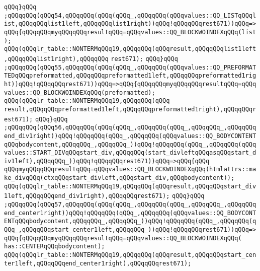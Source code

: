 \verb|qQQq}qQQq|\newline
\verb|;qQQqqQQq(qQQq54,qQQqqQQq(qQQq(qQQq_,qQQqqQQq(qQQqvalues::QQ_LISTqQQqlist,qQQqqQQqlist1left,qQQqqQQqlist1right))qQQq!qQQqqQQqrest671))qQQq=>qQQq{qQQqqQQqmyqQQqqQQqresultqQQq=qQQqvalues::QQ_BLOCKWOINDEXqQQq(list);|\newline
\verb|qQQq(qQQqlr_table::NONTERMqQQq19,qQQqqQQq(qQQqresult,qQQqqQQqlist1left,qQQqqQQqlist1right),qQQqqQQq|\newline
\verb|rest671);|\newline
\verb|qQQq}qQQq|\newline
\verb|;qQQqqQQq(qQQq55,qQQqqQQq(qQQq(qQQq_,qQQqqQQq(qQQqvalues::QQ_PREFORMATTEDqQQqpreformatted,qQQqqQQqpreformatted1left,qQQqqQQqpreformatted1right))qQQq!qQQqqQQqrest671))qQQq=>qQQq{qQQqqQQqmyqQQqqQQqresultqQQq=qQQqvalues::QQ_BLOCKWOINDEXqQQq(preformatted);|\newline
\verb|qQQq(qQQqlr_table::NONTERMqQQq19,qQQqqQQq(qQQq|\newline
\verb|result,qQQqqQQqpreformatted1left,qQQqqQQqpreformatted1right),qQQqqQQqrest671);|\newline
\verb|qQQq}qQQq|\newline
\verb|;qQQqqQQq(qQQq56,qQQqqQQq(qQQq(qQQq_,qQQqqQQq(qQQq_,qQQqqQQq_,qQQqqQQqend_div1right))qQQq!qQQqqQQq(qQQq_,qQQqqQQq(qQQqvalues::QQ_BODYCONTENTqQQqbodycontent,qQQqqQQq_,qQQqqQQq_))qQQq!qQQqqQQq(qQQq_,qQQqqQQq(qQQqvalues::START_DIVqQQqstart_div,qQQqqQQq(start_divleftqQQqasqQQqstart_div1left),qQQqqQQq_))qQQq!qQQqqQQqrest671))qQQq=>qQQq{qQQq|\newline
\verb|qQQqmyqQQqqQQqresultqQQq=qQQqvalues::QQ_BLOCKWOINDEXqQQq(htmlattrs::make_divqQQq(ctxqQQqstart_divleft,qQQqstart_div,qQQqbodycontent));|\newline
\verb|qQQq(qQQqlr_table::NONTERMqQQq19,qQQqqQQq(qQQqresult,qQQqqQQqstart_div1left,qQQqqQQqend_div1right),qQQqqQQqrest671);|\newline
\verb|qQQq}qQQq|\newline
\verb|;qQQqqQQq(qQQq57,qQQqqQQq(qQQq(qQQq_,qQQqqQQq(qQQq_,qQQqqQQq_,qQQqqQQqend_center1right))qQQq!qQQqqQQq(qQQq_,qQQqqQQq(qQQqvalues::QQ_BODYCONTENTqQQqbodycontent,qQQqqQQq_,qQQqqQQq_))qQQq!qQQqqQQq(qQQq_,qQQqqQQq(qQQq_,qQQqqQQqstart_center1left,qQQqqQQq_))qQQq!qQQqqQQqrest671))qQQq=>qQQq{qQQqqQQqmyqQQqqQQqresultqQQq=qQQqvalues::QQ_BLOCKWOINDEXqQQq(|\newline
\verb|has::CENTERqQQqbodycontent);|\newline
\verb|qQQq(qQQqlr_table::NONTERMqQQq19,qQQqqQQq(qQQqresult,qQQqqQQqstart_center1left,qQQqqQQqend_center1right),qQQqqQQqrest671);|\newline
